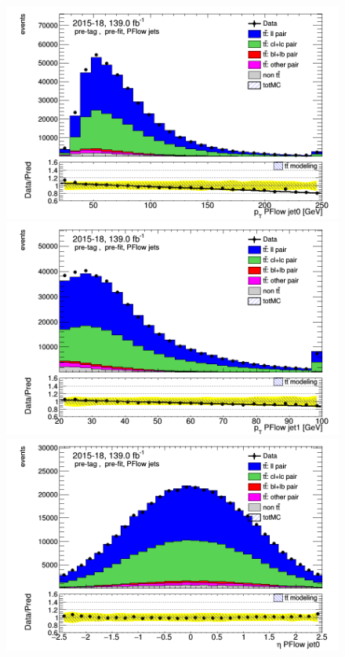\documentclass[letterpaper,12pt]{article}
\begin{document}
\begin{figure}
\begin{minipage}[b]{.45\textwidth}
\centering
\includegraphics[width=1\textwidth]{Oct_distributions/pretagNoRwDL1rwithhighpTPFlow_scaledall/DataMC_J0_pt.png}
\end{minipage}\hfill
\begin{minipage}[b]{.45\textwidth}
\centering
\includegraphics[width=1\textwidth]{Oct_distributions/pretagNoRwDL1rwithhighpTPFlow_scaledall/DataMC_J1_pt.png}
\end{minipage}\hfill
\begin{minipage}[b]{.45\textwidth}
\centering
\includegraphics[width=1\textwidth]{Oct_distributions/pretagNoRwDL1rwithhighpTPFlow_scaledall/DataMC_J0_eta.png}

\end{minipage}
\end{figure}
\end{document}
